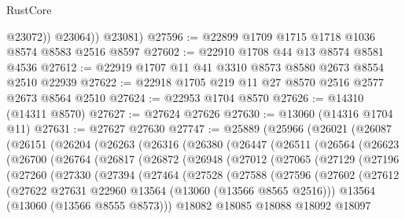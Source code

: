 \begin{lexlean}{RustCore}
\begin{coremodule}
              @23072))
          @23064))
      @23081)
@27596 := @22899 @1709 @1715 @1718 @1036 @8574 @8583 @2516 @8597
@27602 := @22910 @1708 @44 @13 @8574 @8581 @4536
@27612 := @22919 @1707 @11 @41 @3310 @8573 @8580 @2673 @8554 @2510 @22939
@27622 := @22918 @1705 @219 @11 @27 @8570 @2516 @2577 @2673 @8564 @2510
@27624 := @22953 @1704 @8570
@27626 := @14310 (@14311 @8570)
@27627 := @27624 @27626
@27630 := @13060 (@14316 @1704 @11)
@27631 := @27627 @27630
@27747 := @25889
    (@25966
      (@26021
        (@26087
          (@26151
            (@26204
              (@26263
                (@26316
                  (@26380
                    (@26447
                      (@26511
                        (@26564
                          (@26623
                            (@26700
                              (@26764
                                (@26817
                                  (@26872
                                    (@26948
                                      (@27012
                                        (@27065
                                          (@27129
                                            (@27196
                                              (@27260
                                                (@27330
                                                  (@27394
                                                    (@27464
                                                      (@27528
                                                        (@27588
                                                          (@27596
                                                            (@27602
                                                              (@27612
                                                                (@27622
                                                                  @27631
                                                                  @22960
                                                                  @13564
                                                                  (@13060 (@13566 @8565 @2516)))
                                                                @13564
                                                                (@13060 (@13566 @8555 @8573)))
                                                              @18082
                                                              @18085
                                                              @18088
                                                              @18092
                                                              @18097

\end{coremodule}
\end{lexlean}
